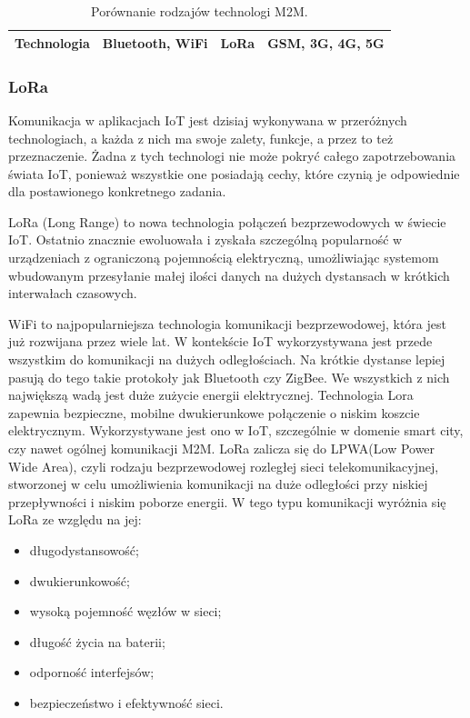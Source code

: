 \begin{table}[!htbp]
{\begin{tabular}{|l|l|l|l|}
  \textbf{Technologia} & Bluetooth, WiFi                                                                                                   & LoRa                                                                                                & GSM, 3G, 4G, 5G                                                                                                 \\ \hline
  \end{tabular}%
  }
  \caption{Porównanie rodzajów technologi M2M.\cite{LoRa-article}}
\end{table}


\subsubsection{LoRa}
Komunikacja w aplikacjach IoT jest dzisiaj wykonywana w przeróżnych technologiach, a każda z nich ma swoje zalety, funkcje, a przez to też przeznaczenie. Żadna z tych technologi nie może pokryć całego zapotrzebowania świata IoT, ponieważ wszystkie one posiadają cechy, które czynią je odpowiednie dla postawionego konkretnego zadania.

LoRa (Long Range) to nowa technologia połączeń bezprzewodowych w świecie IoT. Ostatnio znacznie ewoluowała i zyskała szczególną popularność w urządzeniach z ograniczoną pojemnością elektryczną, umożliwiając systemom wbudowanym przesyłanie małej ilości danych na dużych dystansach w krótkich interwałach czasowych.

WiFi to najpopularniejsza technologia komunikacji bezprzewodowej, która jest już rozwijana przez wiele lat. W kontekście IoT wykorzystywana jest przede wszystkim do komunikacji na dużych
odległościach. Na krótkie dystanse lepiej pasują do tego takie protokoły jak Bluetooth czy ZigBee. We wszystkich z nich największą wadą jest duże zużycie energii elektrycznej. Technologia Lora zapewnia bezpieczne, mobilne dwukierunkowe połączenie o niskim koszcie elektrycznym. Wykorzystywane jest ono w IoT, szczególnie w domenie smart city, czy nawet ogólnej komunikacji M2M. LoRa zalicza się do LPWA(Low Power Wide Area), czyli rodzaju bezprzewodowej rozległej sieci telekomunikacyjnej, stworzonej w celu umożliwienia komunikacji na duże odległości przy niskiej przepływności i niskim poborze energii. \cite{LPWA-wiki} W tego typu komunikacji wyróżnia się LoRa ze względu na jej:
\begin{itemize}
  \setlength\itemsep{0.8mm} %
  \item długodystansowość;
  \item dwukierunkowość;
  \item wysoką pojemność węzłów w sieci;
  \item długość życia na baterii;
  \item odporność interfejsów;
  \item bezpieczeństwo i efektywność sieci. \cite{LoRa-article}
\end{itemize}


